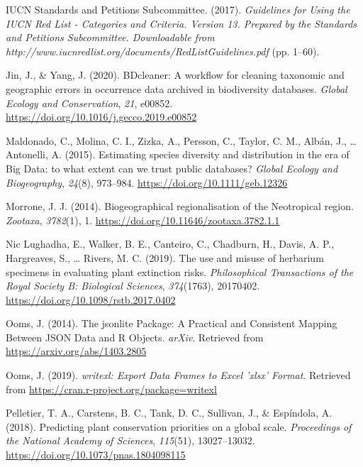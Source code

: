 \documentclass[
  12pt,
]{article}
\begin{document}
\leavevmode\hypertarget{ref-IUCN2017}{}%
IUCN Standards and Petitions Subcommittee. (2017). \emph{Guidelines for Using the IUCN Red List - Categories and Criteria. Version 13. Prepared by the Standards and Petitions Subcommittee. Downloadable from http://www.iucnredlist.org/documents/RedListGuidelines.pdf} (pp. 1--60).

\leavevmode\hypertarget{ref-Jin2020}{}%
Jin, J., \& Yang, J. (2020). BDcleaner: A workflow for cleaning taxonomic and geographic errors in occurrence data archived in biodiversity databases. \emph{Global Ecology and Conservation}, \emph{21}, e00852. \url{https://doi.org/10.1016/j.gecco.2019.e00852}

\leavevmode\hypertarget{ref-Maldonado2015}{}%
Maldonado, C., Molina, C. I., Zizka, A., Persson, C., Taylor, C. M., Albán, J., \ldots{} Antonelli, A. (2015). Estimating species diversity and distribution in the era of Big Data: to what extent can we trust public databases? \emph{Global Ecology and Biogeography}, \emph{24}(8), 973--984. \url{https://doi.org/10.1111/geb.12326}

\leavevmode\hypertarget{ref-Morrone2014}{}%
Morrone, J. J. (2014). Biogeographical regionalisation of the Neotropical region. \emph{Zootaxa}, \emph{3782}(1), 1. \url{https://doi.org/10.11646/zootaxa.3782.1.1}

\leavevmode\hypertarget{ref-NicLughadha2019}{}%
Nic Lughadha, E., Walker, B. E., Canteiro, C., Chadburn, H., Davis, A. P., Hargreaves, S., \ldots{} Rivers, M. C. (2019). The use and misuse of herbarium specimens in evaluating plant extinction risks. \emph{Philosophical Transactions of the Royal Society B: Biological Sciences}, \emph{374}(1763), 20170402. \url{https://doi.org/10.1098/rstb.2017.0402}

\leavevmode\hypertarget{ref-Ooms2014}{}%
Ooms, J. (2014). The jsonlite Package: A Practical and Consistent Mapping Between JSON Data and R Objects. \emph{arXiv}. Retrieved from \url{https://arxiv.org/abs/1403.2805}

\leavevmode\hypertarget{ref-Ooms2019}{}%
Ooms, J. (2019). \emph{writexl: Export Data Frames to Excel 'xlsx' Format}. Retrieved from \url{https://cran.r-project.org/package=writexl}

\leavevmode\hypertarget{ref-Pelletier2018}{}%
Pelletier, T. A., Carstens, B. C., Tank, D. C., Sullivan, J., \& Espíndola, A. (2018). Predicting plant conservation priorities on a global scale. \emph{Proceedings of the National Academy of Sciences}, \emph{115}(51), 13027--13032. \url{https://doi.org/10.1073/pnas.1804098115}
\end{document}
